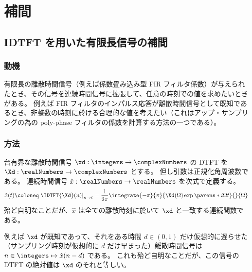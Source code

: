 \chapter{補間}
    \section{IDTFT を用いた有限長信号の補間}
        \label{IDTFT を用いた有限長信号の補間}
        \subsection{動機}
            有限長の離散時間信号（例えば係数畳み込み型 FIR フィルタ係数）が与えられたとき、その信号を連続時間信号に拡張して、任意の時刻での値を求めたいときがある。
            例えば FIR フィルタのインパルス応答が離散時間信号として既知であるとき、非整数の時刻に於ける合理的な値を考えたい（これはアップ・サンプリングの為の poly-phase フィルタの係数を計算する方法の一つである）。
        \subsection{方法}
            \label{IDTFT を用いた有限長信号の補間>方法}
            台有界な離散時間信号 $\xd:\integers\to\complexNumbers$ の DTFT を $\Xd:\realNumbers\to\complexNumbers$ とする。
            但し引数は正規化角周波数である。
            連続時間信号 $\hat{x}:\realNumbers\to\realNumbers$ を次式で定義する。
            \[ \hat{x}(t)\coloneq\left.\IDTFT{\Xd}(n)\right|_{n\to t} = \frac{1}{2\pi}\integrate{-\pi}{\pi}{\Xd(\Omega)\exp\parens*{i\Omega t}}{}{\Omega} \]
            殆ど自明なことだが、$\hat{x}$ は全ての離散時刻に於いて $\xd$ と一致する連続関数である。
            \par
            例えば $\xd$ が既知であって、それをある時間 $d\in(0,1)$ だけ仮想的に遅らせた（サンプリング時刻が仮想的に $d$ だけ早まった）離散時間信号は $n\in\integers\mapsto\hat{x}(n-d)$ である。
            これも殆ど自明なことだが、この信号の DTFT の絶対値は $\xd$ のそれと等しい。
